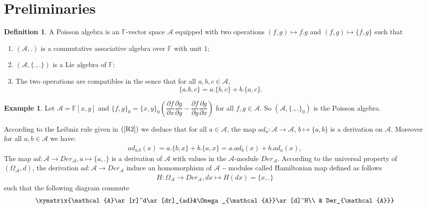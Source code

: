 \documentclass[a4paper, 12pt,oneside,reqno]{amsart}
\theoremstyle{definition}
\newtheorem{definition}[theorem]{Definition}
\newtheorem{example}[theorem]{Example}
\begin{document}
\section{Preliminaries}\label{Rapp}
\begin{definition} \cite{CL}
A Poisson algebra is an $\mathbb{F}$-vector space $\mathcal{A}$ equipped with two operations $(f,g)\mapsto f.g$ and $(f,g)\mapsto \{f,g\}$ such that
  \begin{enumerate}
  \item[i.] $(\mathcal{A},.)$ is a commutative associative algebra over $\mathbb{F}$ with unit 1;
  \item[ii.] $(\mathcal{A},\{.,.\})$ is a Lie algebra of $\mathbb{F}$;
    \item[iii.] The two operations are compatibles in the sence that for all $a,b,c\in \mathcal{A}$,
    \begin{equation}\label{R2}
\{a.b, c\}=a.\{b,c\}+b.\{a,c\}.
    \end{equation}
 \end{enumerate}
\end{definition}
\begin{example} Let  $\mathcal{A} = \mathbb{F}[x,y]$  and
$\{f, g\}_{0} =  \{x,y\}_{0}  \left(\dfrac{\partial f}{\partial x } \dfrac{\partial g}{\partial y } - \dfrac{\partial f}{\partial y } \dfrac{\partial g}{\partial x }\right)$ for all $f,g\in \mathcal{A}$. So $(\mathcal{A}, \{.,.\}_{0})$ is the Poisson algebra. 
\end{example}
 According to the Leibniz rule given in $(\ref{R2})$  we deduce that for all $a\in \mathcal{A}$, the map  $ad_{a} :\mathcal{A}\rightarrow \mathcal{A}$, $b\longmapsto \{a,b\}$ is a derivation on  $\mathcal{A}$. Moreover for all  $a,b\in \mathcal{A}$ we have:
 \begin{eqnarray*}
 ad_{a.b}(x) = a.\{b,x\}+ b.\{a,x\}=a. ad_{b}(x)+b. ad_{a}(x),
 \end{eqnarray*}
   The map $ad :\mathcal{A}\rightarrow Der_{\mathcal{A}},a\longmapsto \{a,.\} $ is a derivation of $\mathcal{A}$  with values in the  $\mathcal{A}$-module $Der_{\mathcal{A}}$. According to the universal property of $(\Omega_{\mathcal{A}}, d)$, the derivation $ad:\mathcal{A} \rightarrow Der_{\mathcal{A}}$ induce an homomorphism of $\mathcal{A}-$modules called Hamiltonian map defined as follows
 \begin{eqnarray}
 H: \Omega_{\mathcal{A}} \rightarrow Der_{\mathcal{A}}, dx\longmapsto H(dx)=\{x,.\}
 \end{eqnarray} such that the following diagram commute
 \begin{eqnarray}
 \xymatrix{\mathcal{A}\ar[r]^d\ar[dr]_{ad}&\Omega_{\mathcal{A}}\ar[d]^H\\
                                   &             Der_{\mathcal{A}}}
 \end{eqnarray}
\end{document}
